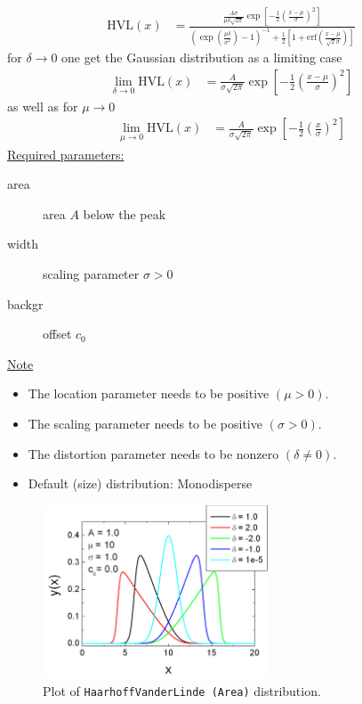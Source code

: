 \begin{align}
\textrm{HVL}(x) & =
\frac{
       \frac{A\sigma}{\mu\delta\sqrt{2\pi}}
       \exp\left[-\frac{1}{2}\left(\frac{x-\mu}{\sigma}\right)^2\right]
     }{
       \left(\exp\left(\frac{\mu\delta}{\sigma^2}\right)-1\right)^{-1}
       + \frac{1}{2}\left[1+\mathrm{erf}\left(\frac{x-\mu}{\sqrt{2}\sigma}\right)\right]
     }
\end{align}
for $\delta\rightarrow 0$ one get the Gaussian distribution as a limiting case
\begin{align}
\lim_{\delta \rightarrow 0} \textrm{HVL}(x) & =
       \frac{A}{\sigma\sqrt{2\pi}}
       \exp\left[-\frac{1}{2}\left(\frac{x-\mu}{\sigma}\right)^2\right]
\end{align}
as well as for $\mu\rightarrow 0$
\begin{align}
\lim_{\mu \rightarrow 0} \textrm{HVL}(x) & =
       \frac{A}{\sigma\sqrt{2\pi}}
       \exp\left[-\frac{1}{2}\left(\frac{x}{\sigma}\right)^2\right]
\end{align}
\uline{Required parameters:}
\begin{description}
    \item[area] area $A$ below the peak
    \item[width] scaling parameter $\sigma > 0$
    \item[backgr] offset $c_0$
\end{description}

\uline{Note}
\begin{itemize}
  \item The location parameter needs to be positive $(\mu > 0)$.
  \item The scaling parameter needs to be positive $(\sigma > 0)$.
  \item The distortion parameter needs to be nonzero $(\delta \neq 0)$.
  \item Default (size) distribution: Monodisperse
\end{itemize}

\begin{figure}[htb]
\begin{center}
\includegraphics[width=0.6\textwidth]{HaarhoffVanderLindeArea.png}
\end{center}
\caption{Plot of \texttt{HaarhoffVanderLinde (Area)} distribution.}
\label{fig:HaarhoffVanderLindeArea}
\end{figure}


